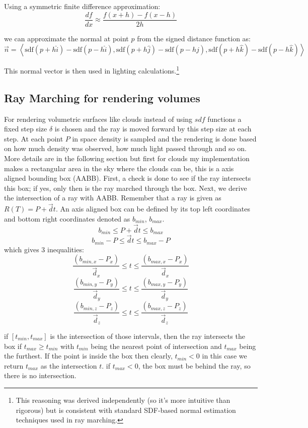 Using a symmetric finite difference approximation:
\[
\frac{df}{dx} \approx \frac{f(x + h) - f(x - h)}{2h}
\]

we can approximate the normal at point $p$ from the signed distance function as:
\[
\vec{n} = \left\langle 
\text{sdf}(p + h\hat{i}) - \text{sdf}(p - h\hat{i}),
\text{sdf}(p + h\hat{j}) - \text{sdf}(p - h\hat{j}),
\text{sdf}(p + h\hat{k}) - \text{sdf}(p - h\hat{k})
\right\rangle
\]

This normal vector is then used in lighting calculations.\footnote{This reasoning was derived independently (so it's more intuitive than rigorous) but is consistent with standard SDF-based normal estimation techniques used in ray marching.}

\subsection{Ray Marching for rendering volumes}
For rendering volumetric surfaces like clouds instead of using $sdf$ functions a fixed step size $\delta$ is chosen and the ray is moved forward by this step size at each step. At each point $P$ in space density is sampled and the rendering is done based on how much density was observed, how much light passed through and so on. More details are in the following section but first for clouds my implementation makes a rectangular area in the sky where the clouds can be, this is a axis aligned bounding box (AABB). First, a check is done to see if the ray intersects this box; if yes, only then is the ray marched through the box.
Next, we derive the intersection of a ray with AABB. Remember that a ray is given as $R(T) = P + \vec{d}t$. An axis aligned box can be defined by its top left coordinates and bottom right coordinates denoted as $b_{min}$, $b_{max}$.
\[
b_{min} \le P + \vec{d}t \le b_{max}
\]
\[
b_{min} - P \le \vec{d}t \le b_{max} - P
\]
which gives 3 inequalities:
\[
\frac{(b_{min, x} - P_x)}{\vec{d}_x} \le t \le \frac{(b_{max, x} - P_x)}{\vec{d}_x}
\]
\[
\frac{(b_{min, y} - P_y)}{\vec{d}_y} \le t \le \frac{(b_{max, y} - P_y)}{\vec{d}_y}
\]
\[
\frac{(b_{min, z} - P_z)}{\vec{d}_z} \le t \le \frac{(b_{max, z} - P_z)}{\vec{d}_z}
\]

if $[t_{min}, t_{max}]$ is the intersection of those intervals, then the ray intersects the box if $t_{max} \ge t_{min}$ with $t_{min}$ being the nearest point of intersection and $t_{max}$ being the furthest. If the point is inside the box then clearly, $t_{min} < 0$ in this case we return $t_{max}$ as the intersection $t$. if $t_{max} < 0$, the box must be behind the ray, so there is no intersection.

